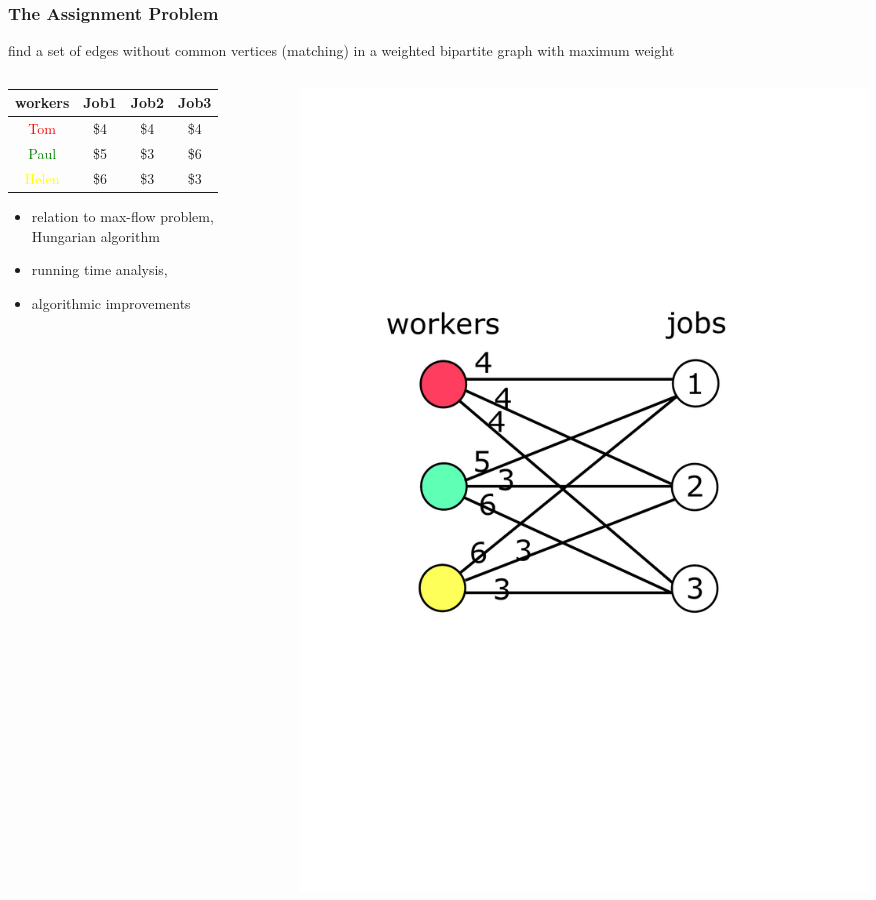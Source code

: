 \documentclass[titlepage,german,presentation]{beamer}
\begin{document}
\begin{frame}
\frametitle{The Assignment Problem}
\begin{block}{}
  find a set of edges without common vertices (matching) in a weighted bipartite graph with maximum weight
\end{block}
\vspace{-1cm}
    \begin{columns}
    \begin{column}{.5\textwidth}
\begin{table}[!ht]
   \begin{tabular}{|c|c|c|c|} \hline
     workers& Job1 & Job2 & Job3 \\ \hline
     \textcolor{red}{Tom} & \$4  & \$4   & \$4  \\ \hline
     \textcolor{green}{Paul} & \$5 & \$3 & \$6\\  \hline
     \textcolor{yellow}{Helen} &  \$6 & \$3 & \$3 \\ \hline
     \end{tabular}
\end{table} 
\begin{itemize}
\item  relation to max-flow problem, Hungarian algorithm~\cite{daglib12}
\item running time analysis,
\item algorithmic improvements
\end{itemize}
        \end{column}
        \begin{column}{.5\textwidth}
        \centering
\includegraphics[height=1.3\textwidth]{assignment.pdf}

\end{column}
\end{columns}
\end{frame}
\end{document}
